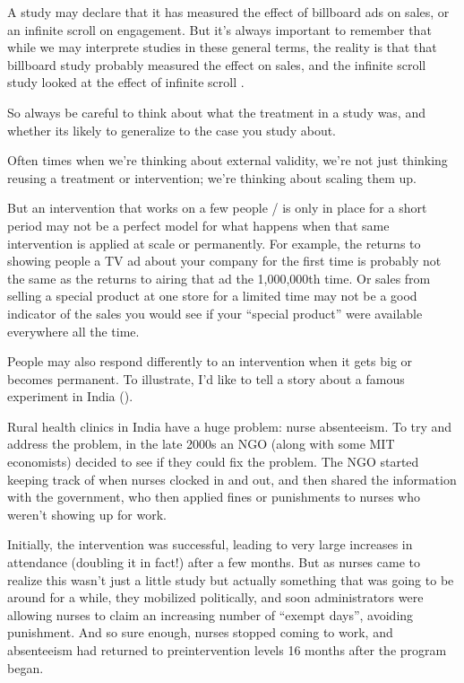 \documentclass[letterpaper,10pt,english]{jupyterBook}
\begin{document}
\sphinxAtStartPar
A study may declare that it has measured the effect of billboard ads on sales, or an infinite scroll on engagement. But it’s always important to remember that while we may interprete studies in these general terms, the reality is that that billboard study probably measured the effect  on sales, and the infinite scroll study looked at the effect of infinite scroll .

\sphinxAtStartPar
So always be careful to think about what  the treatment in a study was, and whether its likely to generalize to the case you study about.

\sphinxAtStartPar
{}

\sphinxAtStartPar
Often times when we’re thinking about external validity, we’re not just thinking re\sphinxhyphen{}using a treatment or intervention; we’re thinking about scaling them up.

\sphinxAtStartPar
But an intervention that works on a few people / is only in place for a short period may not be a perfect model for what happens when that same intervention is applied at scale or permanently. For example, the returns to showing people a TV ad about your company for the first time is probably not the same as the returns to airing that ad the 1,000,000th time. Or sales from selling a special product at one store for a limited time may not be a good indicator of the sales you would see if your “special product” were available everywhere all the time.

\sphinxAtStartPar
People may also respond differently to an intervention when it gets big or becomes permanent. To illustrate, I’d like to tell a story about a famous experiment in India ().

\sphinxAtStartPar
Rural health clinics in India have a huge problem: nurse absenteeism. To try and address the problem, in the late 2000s an NGO (along with some MIT economists) decided to see if they could fix the problem. The NGO started keeping track of when nurses clocked in and out, and then shared the information with the government, who then applied fines or punishments to nurses who weren’t showing up for work.

\sphinxAtStartPar
Initially, the intervention was successful, leading to very large increases in attendance (doubling it in fact!) after a few months. But as nurses came to realize this wasn’t just a little study but actually something that was going to be around for a while, they mobilized politically, and soon administrators were allowing nurses to claim an increasing number of “exempt days”, avoiding punishment. And so sure enough, nurses stopped coming to work, and absenteeism had returned to pre\sphinxhyphen{}intervention levels 16 months after the program began.
\end{document}
